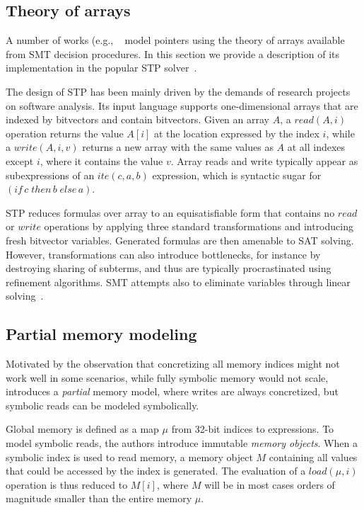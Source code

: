 
\subsection{Theory of arrays}
A number of works (e.g., ~\cite{EXE-CCS06,KLEE-OSDI08,SAGE-NDSS08} model pointers using the theory of arrays available from SMT decision procedures. In this section we provide a description of its implementation in the popular STP solver~\cite{STP-CAV07}.

The design of STP has been mainly driven by the demands of research projects on software analysis. Its input language supports one-dimensional arrays that are indexed by bitvectors and contain bitvectors. Given an array $A$, a $read(A,i)$ operation returns the value $A[i]$ at the location expressed by the index $i$, while a $write(A,i,v)$ returns a new array with the same values as $A$ at all indexes except $i$, where it contains the value $v$. Array reads and write typically appear as subexpressions of an $ite(c,a,b)$ expression, which is syntactic sugar for $(if\,c\;then\,b\;else\,a)$.

STP reduces formulas over array to an equisatisfiable form that contains no $read$ or $write$ operations by applying three standard transformations and introducing fresh bitvector variables. Generated formulas are then amenable to SAT solving. However, transformations can also introduce bottlenecks, for instance by destroying sharing of subterms, and thus are typically procrastinated using refinement algorithms. SMT attempts also to eliminate variables through linear solving~\cite{STP-CAV07}.

\subsection{Partial memory modeling}
\label{ss:index-based-memory}
Motivated by the observation that concretizing all memory indices might not work well in some scenarios, while fully symbolic memory would not scale, ~\cite{MAYHEM-SP12} introduces a {\em partial} memory model, where writes are always concretized, but symbolic reads can be modeled symbolically.

Global memory is defined as a map $\mu$ from 32-bit indices to expressions. To model symbolic reads, the authors introduce immutable {\em memory objects}. When a symbolic index is used to read memory, a memory object $M$ containing all values that could be accessed by the index is generated. The evaluation of a $load(\mu,i)$ operation is thus reduced to $M[i]$, where $M$ will be in most cases orders of magnitude smaller than the entire memory $\mu$.

